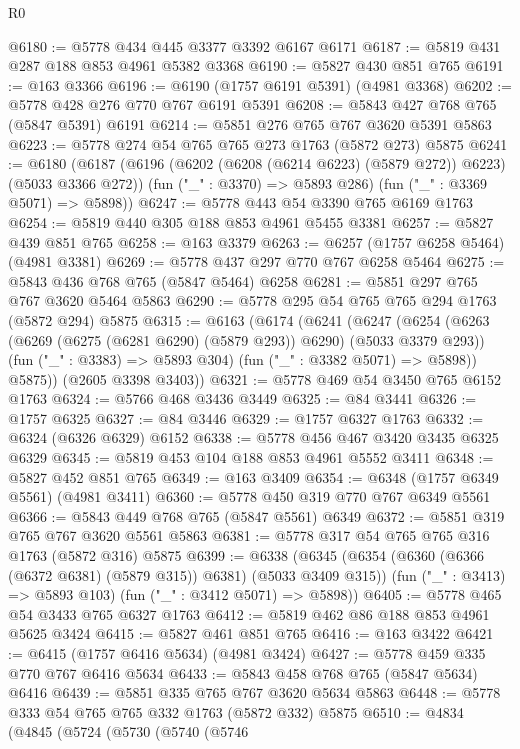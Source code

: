 \begin{lexlean}{R0}
\begin{coremodule}
@6180 := @5778 @434 @445 @3377 @3392 @6167 @6171
@6187 := @5819 @431 @287 @188 @853 @4961 @5382 @3368
@6190 := @5827 @430 @851 @765
@6191 := @163 @3366
@6196 := @6190 (@1757 @6191 @5391) (@4981 @3368)
@6202 := @5778 @428 @276 @770 @767 @6191 @5391
@6208 := @5843 @427 @768 @765 (@5847 @5391) @6191
@6214 := @5851 @276 @765 @767 @3620 @5391 @5863
@6223 := @5778 @274 @54 @765 @765 @273 @1763 (@5872 @273) @5875
@6241 := @6180
    (@6187
      (@6196 (@6202 (@6208 (@6214 @6223) (@5879 @272)) @6223) (@5033 @3366 @272))
      (fun ("_" : @3370) => @5893 @286)
      (fun ("_" : @3369 @5071) => @5898))
@6247 := @5778 @443 @54 @3390 @765 @6169 @1763
@6254 := @5819 @440 @305 @188 @853 @4961 @5455 @3381
@6257 := @5827 @439 @851 @765
@6258 := @163 @3379
@6263 := @6257 (@1757 @6258 @5464) (@4981 @3381)
@6269 := @5778 @437 @297 @770 @767 @6258 @5464
@6275 := @5843 @436 @768 @765 (@5847 @5464) @6258
@6281 := @5851 @297 @765 @767 @3620 @5464 @5863
@6290 := @5778 @295 @54 @765 @765 @294 @1763 (@5872 @294) @5875
@6315 := @6163
    (@6174
      (@6241
        (@6247
          (@6254
            (@6263 (@6269 (@6275 (@6281 @6290) (@5879 @293)) @6290) (@5033 @3379 @293))
            (fun ("_" : @3383) => @5893 @304)
            (fun ("_" : @3382 @5071) => @5898))
          @5875))
      (@2605 @3398 @3403))
@6321 := @5778 @469 @54 @3450 @765 @6152 @1763
@6324 := @5766 @468 @3436 @3449
@6325 := @84 @3441
@6326 := @1757 @6325
@6327 := @84 @3446
@6329 := @1757 @6327 @1763
@6332 := @6324 (@6326 @6329) @6152
@6338 := @5778 @456 @467 @3420 @3435 @6325 @6329
@6345 := @5819 @453 @104 @188 @853 @4961 @5552 @3411
@6348 := @5827 @452 @851 @765
@6349 := @163 @3409
@6354 := @6348 (@1757 @6349 @5561) (@4981 @3411)
@6360 := @5778 @450 @319 @770 @767 @6349 @5561
@6366 := @5843 @449 @768 @765 (@5847 @5561) @6349
@6372 := @5851 @319 @765 @767 @3620 @5561 @5863
@6381 := @5778 @317 @54 @765 @765 @316 @1763 (@5872 @316) @5875
@6399 := @6338
    (@6345
      (@6354 (@6360 (@6366 (@6372 @6381) (@5879 @315)) @6381) (@5033 @3409 @315))
      (fun ("_" : @3413) => @5893 @103)
      (fun ("_" : @3412 @5071) => @5898))
@6405 := @5778 @465 @54 @3433 @765 @6327 @1763
@6412 := @5819 @462 @86 @188 @853 @4961 @5625 @3424
@6415 := @5827 @461 @851 @765
@6416 := @163 @3422
@6421 := @6415 (@1757 @6416 @5634) (@4981 @3424)
@6427 := @5778 @459 @335 @770 @767 @6416 @5634
@6433 := @5843 @458 @768 @765 (@5847 @5634) @6416
@6439 := @5851 @335 @765 @767 @3620 @5634 @5863
@6448 := @5778 @333 @54 @765 @765 @332 @1763 (@5872 @332) @5875
@6510 := @4834
    (@4845
      (@5724
        (@5730
          (@5740
            (@5746

\end{coremodule}
\end{lexlean}
